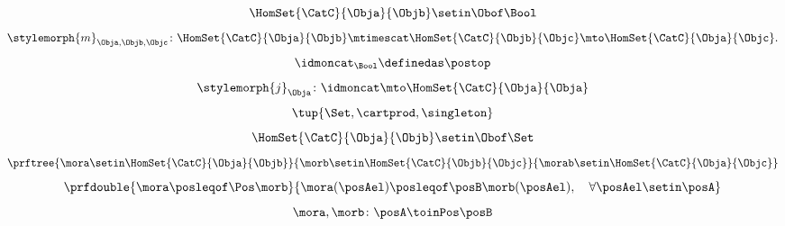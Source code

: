 {\begin{forslides}
\begin{equation}
            \HomSet{\CatC}{\Obja}{\Objb}\setin \Obof\Bool
        \end{equation}
        \begin{equation}
            \label{eq:poset_bool_h}
            \stylemorph{m}_{\Obja,\Objb,\Objc}\colon \HomSet{\CatC}{\Obja}{\Objb}\mtimescat \HomSet{\CatC}{\Objb}{\Objc}\mto \HomSet{\CatC}{\Obja}{\Objc}.
        \end{equation}
        \begin{equation}
            \label{eq:poset_bool_i}
            \idmoncat_{\Bool} \definedas \postop
        \end{equation}
        \begin{equation}
            \label{eq:poset_bool_k}
            \stylemorph{j}_\Obja\colon \idmoncat \mto \HomSet{\CatC}{\Obja}{\Obja}
        \end{equation}
        \begin{equation}
            \label{eq:poset_bool_j}
            \tup{\Set, {{\cartprod}}, \singleton}
        \end{equation}
        \begin{equation}
            \label{eq:poset_bool_l}
            \HomSet{\CatC}{\Obja}{\Objb}\setin \Obof\Set
        \end{equation}
        \begin{equation}
            \label{eq:poset_bool_m}
            \prftree{\mora \setin \HomSet{\CatC}{\Obja}{\Objb}}{\morb \setin \HomSet{\CatC}{\Objb}{\Objc}}{{\morab \setin \HomSet{\CatC}{\Obja}{\Objc}}}
        \end{equation}
        \begin{equation}
            \label{eq:poset_pos_a}
            \prfdouble{
                \mora \posleqof\Pos \morb}{\mora(\posAel)\posleqof\posB \morb(\posAel), \quad \forall \posAel \setin \posA}
        \end{equation}
        \begin{equation}
            \label{eq:poset_pos_b}
            \mora,\morb\colon \posA\toinPos \posB
        \end{equation}
    \end{forslides}
}
